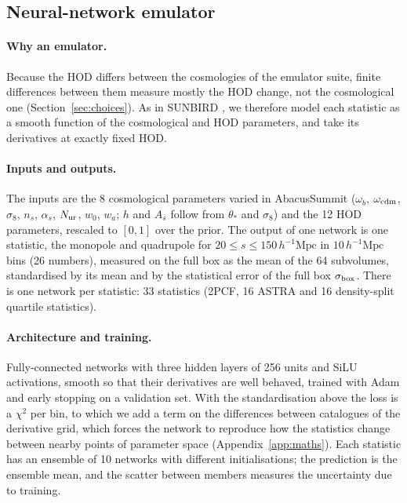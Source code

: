 \documentclass[11pt,twocolumn]{article}
\newcommand{\Mpch}{\,h^{-1}\mathrm{Mpc}}
\begin{document}
\subsection{Neural-network emulator}
\label{sec:emulator}

\paragraph{Why an emulator.} Because the HOD differs between the cosmologies of the emulator suite, finite differences between them measure mostly the HOD change, not the cosmological one (Section~\ref{sec:choices}). As in SUNBIRD \cite{CuestaLazaro2024}, we therefore model each statistic as a smooth function of the cosmological and HOD parameters, and take its derivatives at exactly fixed HOD.

\paragraph{Inputs and outputs.} The inputs are the 8 cosmological parameters varied in AbacusSummit ($\omega_b$, $\omega_{\rm cdm}$, $\sigma_8$, $n_s$, $\alpha_s$, $N_{\rm ur}$, $w_0$, $w_a$; $h$ and $A_s$ follow from $\theta_*$ and $\sigma_8$) and the 12 HOD parameters, rescaled to $[0,1]$ over the prior. The output of one network is one statistic, the monopole and quadrupole for $20\le s\le150\Mpch$ in $10\Mpch$ bins (26 numbers), measured on the full box as the mean of the 64 subvolumes, standardised by its mean and by the statistical error of the full box $\sigma_{\rm box}$. There is one network per statistic: 33 statistics (2PCF, 16 ASTRA and 16 density-split quartile statistics).

\paragraph{Architecture and training.} Fully-connected networks with three hidden layers of 256 units and SiLU activations, smooth so that their derivatives are well behaved, trained with Adam and early stopping on a validation set. With the standardisation above the loss is a $\chi^2$ per bin, to which we add a term on the differences between catalogues of the derivative grid, which forces the network to reproduce how the statistics change between nearby points of parameter space (Appendix~\ref{app:maths}). Each statistic has an ensemble of 10 networks with different initialisations; the prediction is the ensemble mean, and the scatter between members measures the uncertainty due to training.
\end{document}
